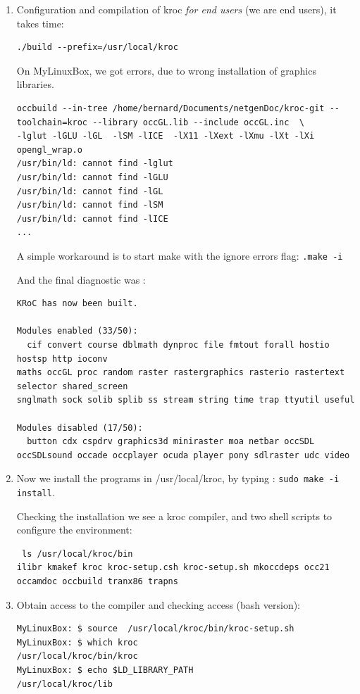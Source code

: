 \documentclass[times,a4paper]{book}
\begin{document}
\begin{enumerate}
\item Configuration and compilation of kroc {\sl for end users} (we are end users),  it takes time:



\begin{lstlisting}  
./build --prefix=/usr/local/kroc
\end{lstlisting}  

On MyLinuxBox, we got errors, due to wrong  installation of graphics libraries.
\begin{lstlisting} 
occbuild --in-tree /home/bernard/Documents/netgenDoc/kroc-git --toolchain=kroc --library occGL.lib --include occGL.inc  \
-lglut -lGLU -lGL  -lSM -lICE  -lX11 -lXext -lXmu -lXt -lXi    opengl_wrap.o
/usr/bin/ld: cannot find -lglut
/usr/bin/ld: cannot find -lGLU
/usr/bin/ld: cannot find -lGL
/usr/bin/ld: cannot find -lSM
/usr/bin/ld: cannot find -lICE
...
\end{lstlisting} 

A simple workaround is to start make with the ignore errors flag:
{\tt .make -i
}

And the final diagnostic was :
\begin{lstlisting} 
KRoC has now been built.

Modules enabled (33/50):
  cif convert course dblmath dynproc file fmtout forall hostio hostsp http ioconv 
maths occGL proc random raster rastergraphics rasterio rastertext selector shared_screen 
snglmath sock solib splib ss stream string time trap ttyutil useful

Modules disabled (17/50):
  button cdx cspdrv graphics3d miniraster moa netbar occSDL occSDLsound occade occplayer ocuda player pony sdlraster udc video
\end{lstlisting} 


\item Now we install the programs in /usr/local/kroc,  by typing : {\tt sudo make -i install}.

Checking the installation we see a kroc compiler, and two shell scripts to configure the environment:
\begin{lstlisting} 
 ls /usr/local/kroc/bin
ilibr kmakef kroc kroc-setup.csh kroc-setup.sh mkoccdeps occ21 occamdoc occbuild tranx86 trapns
\end{lstlisting} 

\item Obtain access to the compiler and checking access (bash version):
\begin{lstlisting} 
MyLinuxBox: $ source  /usr/local/kroc/bin/kroc-setup.sh
MyLinuxBox: $ which kroc
/usr/local/kroc/bin/kroc 
MyLinuxBox: $ echo $LD_LIBRARY_PATH
/usr/local/kroc/lib
\end{lstlisting} 


\end{enumerate}
\end{document}
